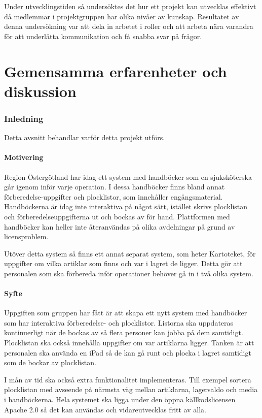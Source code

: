 \documentclass{article}
\begin{document}
Under utvecklingstiden så undersöktes det hur ett projekt kan utvecklas effektivt då medlemmar i projektgruppen har olika nivåer av kunskap. Resultatet av denna undersökning var att dela in arbetet i roller och att arbeta nära varandra för att underlätta kommunikation och få snabba svar på frågor.
\newpage
\tableofcontents
\newpage
{}

\part{Gemensamma erfarenheter och diskussion}

\section{Inledning}
Detta avsnitt behandlar varför detta projekt utförs.

\subsection{Motivering}
Region Östergötland har idag ett system med handböcker som en sjuksköterska går igenom inför varje operation. I dessa handböcker finns bland annat förberedelse-uppgifter och plocklistor, som innehåller engångsmaterial. Handböckerna är idag inte interaktiva på något sätt, istället skrivs plocklistan och förberedelse\-uppgifterna ut och bockas av för hand. Plattformen med handböcker kan heller inte återanvändas på olika avdelningar på grund av licensproblem. 

Utöver detta system så finns ett annat separat system, som heter Kartoteket, för uppgifter om vilka artiklar som finns och var i lagret de ligger. Detta gör att personalen som ska förbereda inför operationer behöver gå in i två olika system. 

\subsection{Syfte}
Uppgiften som gruppen har fått är att skapa ett nytt system med handböcker som har interaktiva förberedelse- och plocklistor. Listorna ska uppdateras kontinuerligt när de bockas av så flera personer kan jobba på dem samtidigt. Plocklistan ska också innehålla uppgifter om var artiklarna ligger. Tanken är att personalen 
ska använda en iPad så de kan gå runt och plocka i lagret samtidigt som de bockar av plocklistan.

I mån av tid ska också extra funktionalitet implementeras. Till exempel sortera plocklistan med avseende på närmsta väg mellan artiklarna, lagersaldo och media i handböckerna.
Hela systemet ska ligga under den öppna källkodslicensen Apache 2.0 \cite{apache} så det kan användas och vidareutvecklas fritt av alla.    
\end{document}
